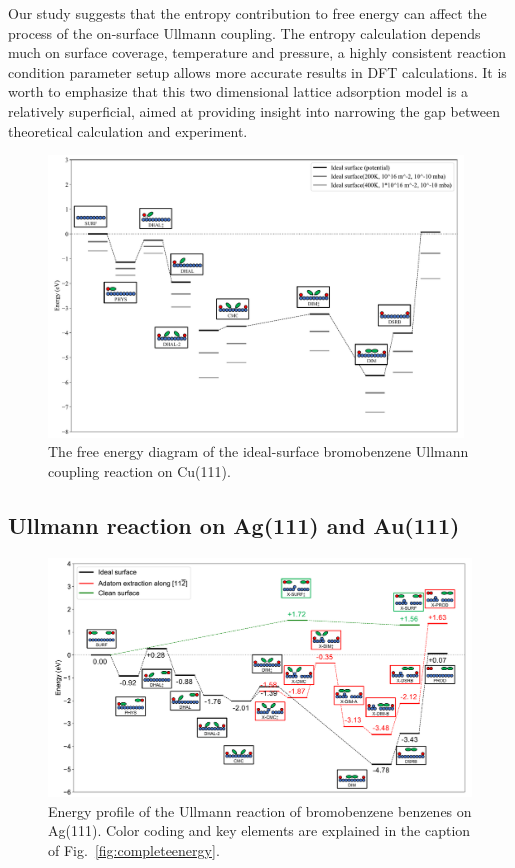 \documentclass[aps,prb,reprint,amsmath,amssymb]{revtex4-1}
\begin{document}
{Our study suggests that the entropy contribution to free energy can affect the process of the on-surface Ullmann coupling. The entropy calculation depends much on surface coverage, temperature and pressure, a highly consistent reaction condition parameter setup allows more accurate results in DFT calculations. It is worth to emphasize that this two dimensional lattice adsorption model is a relatively superficial, aimed at providing insight into narrowing the gap between theoretical calculation and experiment. 
}

\begin{figure}[hbt]
\centering
\includegraphics[width=0.98\textwidth]{Fig/entropy-correction.pdf}
\caption{The free energy diagram of the ideal-surface bromobenzene Ullmann coupling reaction on Cu(111).}
\label{fig:entropy}
\end{figure}

\fi

\ifdefined\INTERNAL
\subsection{Ullmann reaction on Ag(111) and Au(111)}
\fi

\begin{figure}[hbt]
\centering
\includegraphics[width=1.\textwidth]{Fig/Ag_mainfile.pdf}
\caption{Energy profile of the Ullmann reaction of bromobenzene benzenes on Ag(111). Color coding and key elements are explained in the caption of Fig.~\ref{fig:completeenergy}.}
\label{fig:Ag_all}
\end{figure}
\end{document}
